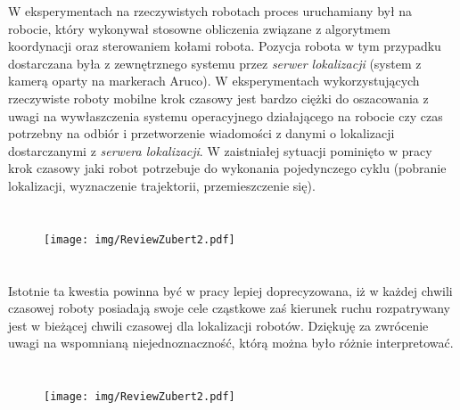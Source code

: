 \begin{frame}
{W eksperymentach na rzeczywistych robotach proces uruchamiany był na robocie, który wykonywał stosowne obliczenia związane z algorytmem koordynacji oraz sterowaniem kołami robota. Pozycja robota w tym przypadku dostarczana była z zewnętrznego systemu przez \textit{serwer lokalizacji} (system z kamerą oparty na markerach Aruco). W eksperymentach wykorzystujących rzeczywiste roboty mobilne krok czasowy jest bardzo ciężki do oszacowania z uwagi na wywłaszczenia systemu operacyjnego działającego na robocie czy czas potrzebny na odbiór i przetworzenie wiadomości z danymi o lokalizacji dostarczanymi z \textit{serwera lokalizacji}. W zaistniałej sytuacji pominięto w pracy krok czasowy jaki robot potrzebuje do wykonania pojedynczego cyklu (pobranie lokalizacji,  wyznaczenie trajektorii, przemieszczenie się). 


}
\end{frame}



\section*{}
\begin{frame}
\frametitle{\secname}
\begin{figure}[!ht]
	\centering
	\texttt{[image: img/ReviewZubert2.pdf]}	
\end{figure}
\end{frame}

\section*{}
\begin{frame}
\frametitle{\secname}
Istotnie ta kwestia powinna być w pracy lepiej doprecyzowana, iż w każdej chwili czasowej roboty posiadają swoje cele cząstkowe zaś kierunek ruchu rozpatrywany jest w bieżącej chwili czasowej dla lokalizacji robotów. Dziękuję za zwrócenie uwagi na wspomnianą niejednoznaczność, którą można było różnie interpretować. 
\end{frame}

\section*{}
\begin{frame}
\frametitle{\secname}
\begin{figure}[!ht]
\centering
\texttt{[image: img/ReviewZubert2.pdf]}	
\end{figure}
\end{frame}

